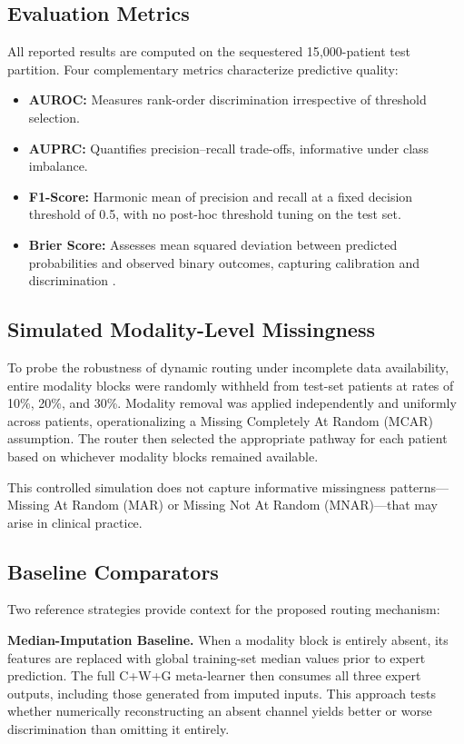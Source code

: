 \documentclass[10pt,twocolumn,letterpaper]{article}
\begin{document}
\subsection{Evaluation Metrics}
All reported results are computed on the sequestered 15{,}000-patient test partition. Four complementary metrics characterize predictive quality:
\begin{itemize}
    \item \textbf{AUROC:} Measures rank-order discrimination irrespective of threshold selection.
    \item \textbf{AUPRC:} Quantifies precision--recall trade-offs, informative under class imbalance.
    \item \textbf{F1-Score:} Harmonic mean of precision and recall at a fixed decision threshold of 0.5, with no post-hoc threshold tuning on the test set.
    \item \textbf{Brier Score:} Assesses mean squared deviation between predicted probabilities and observed binary outcomes, capturing calibration and discrimination \citep{brier1950verification}.
\end{itemize}

\subsection{Simulated Modality-Level Missingness}
To probe the robustness of dynamic routing under incomplete data availability, entire modality blocks were randomly withheld from test-set patients at rates of 10\%, 20\%, and 30\%. Modality removal was applied independently and uniformly across patients, operationalizing a Missing Completely At Random (MCAR) assumption. The router then selected the appropriate pathway for each patient based on whichever modality blocks remained available.

This controlled simulation does not capture informative missingness patterns---Missing At Random (MAR) or Missing Not At Random (MNAR)---that may arise in clinical practice.

\subsection{Baseline Comparators}
Two reference strategies provide context for the proposed routing mechanism:

\textbf{Median-Imputation Baseline.} When a modality block is entirely absent, its features are replaced with global training-set median values prior to expert prediction. The full C+W+G meta-learner then consumes all three expert outputs, including those generated from imputed inputs. This approach tests whether numerically reconstructing an absent channel yields better or worse discrimination than omitting it entirely.
\end{document}
